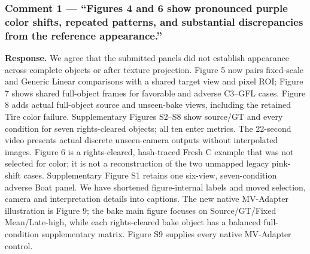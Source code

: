 \documentclass[
  10pt,
]{article}
\begin{document}
\hypertarget{comment-1-figures-4-and-6-show-pronounced-purple-color-shifts-repeated-patterns-and-substantial-discrepancies-from-the-reference-appearance.}{%
\subsubsection{Comment 1 --- ``Figures 4 and 6 show pronounced purple
color shifts, repeated patterns, and substantial discrepancies from the
reference
appearance.''}\label{comment-1-figures-4-and-6-show-pronounced-purple-color-shifts-repeated-patterns-and-substantial-discrepancies-from-the-reference-appearance.}}

\textbf{Response.} We agree that the submitted panels did not establish
appearance across complete objects or after texture projection. Figure 5
now pairs fixed-scale and Generic Linear comparisons with a shared
target view and pixel ROI; Figure 7 shows shared full-object frames for
favorable and adverse C3--GFL cases. Figure 8 adds actual full-object
source and unseen-bake views, including the retained Tire color failure.
Supplementary Figures S2--S8 show source/GT and every condition for
seven rights-cleared objects; all ten enter metrics. The 22-second video
presents actual discrete unseen-camera outputs without interpolated
images. Figure 6 is a rights-cleared, hash-traced Fresh C example that
was not selected for color; it is not a reconstruction of the two
unmapped legacy pink-shift cases. Supplementary Figure S1 retains one
six-view, seven-condition adverse Boat panel. We have shortened
figure-internal labels and moved selection, camera and interpretation
details into captions. The new native MV-Adapter illustration is Figure
9; the bake main figure focuses on Source/GT/Fixed Mean/Late-high, while
each rights-cleared bake object has a balanced full-condition
supplementary matrix. Figure S9 supplies every native MV-Adapter
control.
\end{document}
